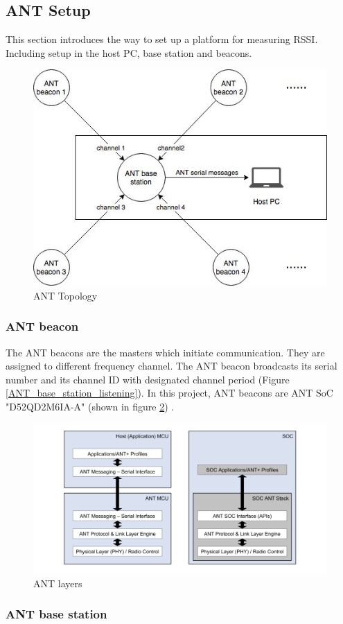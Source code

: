 \documentclass{article}
\begin{document}
\subsection{ANT Setup}

This section introduces the way to set up a platform for measuring RSSI. Including setup in the host PC, base station and beacons.
	
\begin{figure}[!h]
\begin{center}
\includegraphics[width=0.5\columnwidth]{Figures/ANT_topology_laptop.jpg}
\caption{ANT Topology}
\label{ANT_topology}
\end{center}
\end{figure}

\subsubsection{ANT beacon} 
The ANT beacons are the masters which initiate communication. They are assigned to different frequency channel. The ANT beacon broadcasts  its serial number and its channel ID with designated channel period (Figure \ref{ANT_base_station_listening}). In this project, ANT beacons are ANT SoC  "D52QD2M6IA-A" (shown in figure \ref{ANT_layers}) .

\begin{figure}[!h]
\begin{center}
\includegraphics[width=0.5\columnwidth]{Figures/ANT_layers.png}
\caption{ANT layers}
\label{ANT_layers}
\end{center}
\end{figure}

\subsubsection{ANT base station}
\end{document}
